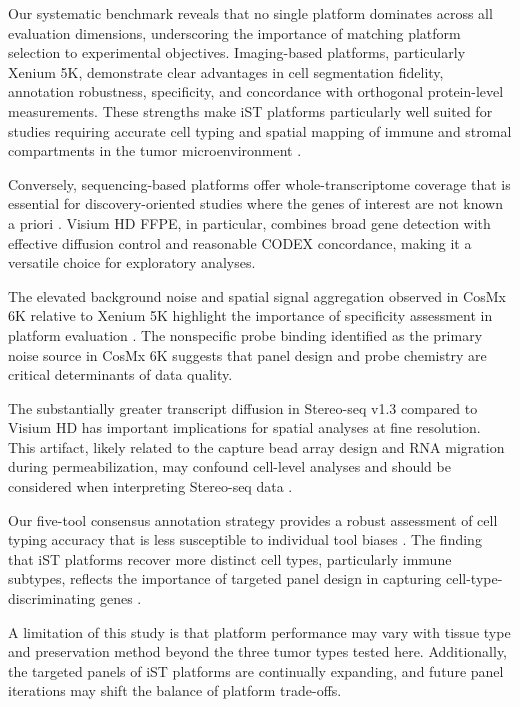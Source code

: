 \documentclass[11pt]{article}
\begin{document}
Our systematic benchmark reveals that no single platform dominates across all evaluation dimensions, underscoring the importance of matching platform selection to experimental objectives. Imaging-based platforms, particularly Xenium 5K, demonstrate clear advantages in cell segmentation fidelity, annotation robustness, specificity, and concordance with orthogonal protein-level measurements. These strengths make iST platforms particularly well suited for studies requiring accurate cell typing and spatial mapping of immune and stromal compartments in the tumor microenvironment \citep{wu2021single, zhang2021single}.

Conversely, sequencing-based platforms offer whole-transcriptome coverage that is essential for discovery-oriented studies where the genes of interest are not known a priori \citep{chen2022spatiotemporal, stickels2021highly}. Visium HD FFPE, in particular, combines broad gene detection with effective diffusion control and reasonable CODEX concordance, making it a versatile choice for exploratory analyses.

The elevated background noise and spatial signal aggregation observed in CosMx 6K relative to Xenium 5K highlight the importance of specificity assessment in platform evaluation \citep{he2022high}. The nonspecific probe binding identified as the primary noise source in CosMx 6K suggests that panel design and probe chemistry are critical determinants of data quality.

The substantially greater transcript diffusion in Stereo-seq v1.3 compared to Visium HD has important implications for spatial analyses at fine resolution. This artifact, likely related to the capture bead array design and RNA migration during permeabilization, may confound cell-level analyses and should be considered when interpreting Stereo-seq data \citep{chen2022spatiotemporal}.

Our five-tool consensus annotation strategy provides a robust assessment of cell typing accuracy that is less susceptible to individual tool biases \citep{abdelaal2019comparison, dominguez2022cross}. The finding that iST platforms recover more distinct cell types, particularly immune subtypes, reflects the importance of targeted panel design in capturing cell-type-discriminating genes \citep{janesick2023high}.

A limitation of this study is that platform performance may vary with tissue type and preservation method beyond the three tumor types tested here. Additionally, the targeted panels of iST platforms are continually expanding, and future panel iterations may shift the balance of platform trade-offs.
\end{document}
